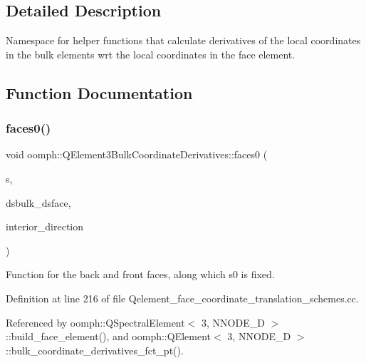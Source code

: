 \subsection{Detailed Description}
Namespace for helper functions that calculate derivatives of the local coordinates in the bulk elements wrt the local coordinates in the face element. 

\subsection{Function Documentation}
\mbox{\label{namespaceoomph_1_1QElement3BulkCoordinateDerivatives_a5db40fd51122a966dc826e7c692a1218}} 
\subsubsection{\texorpdfstring{faces0()}{faces0()}}
{\footnotesize\ttfamily void oomph\+::\+Q\+Element3\+Bulk\+Coordinate\+Derivatives\+::faces0 (\begin{DoxyParamCaption}\item[{const \hyperlink{classoomph_1_1Vector}{Vector}$<$ double $>$ \&}]{s,  }\item[{\hyperlink{classoomph_1_1DenseMatrix}{Dense\+Matrix}$<$ double $>$ \&}]{dsbulk\+\_\+dsface,  }\item[{unsigned \&}]{interior\+\_\+direction }\end{DoxyParamCaption})}



Function for the back and front faces, along which s0 is fixed. 



Definition at line 216 of file Qelement\+\_\+face\+\_\+coordinate\+\_\+translation\+\_\+schemes.\+cc.



Referenced by oomph\+::\+Q\+Spectral\+Element$<$ 3, N\+N\+O\+D\+E\+\_\+D $>$\+::build\+\_\+face\+\_\+element(), and oomph\+::\+Q\+Element$<$ 3, N\+N\+O\+D\+E\+\_\+D $>$\+::bulk\+\_\+coordinate\+\_\+derivatives\+\_\+fct\+\_\+pt().

\mbox{\label{namespaceoomph_1_1QElement3BulkCoordinateDerivatives_a99b7b4ae34e0a5b95e9f8d7c3396f79a}} 
